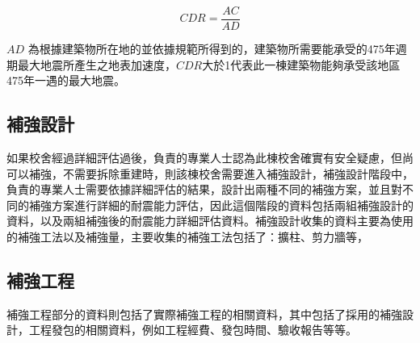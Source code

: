 \begin{equation} CDR = \dfrac{AC}{AD} \label{eq:CDR}\end{equation} 

$AD$ 為根據建築物所在地的並依據規範所得到的，建築物所需要能承受的475年週期最大地震所產生之地表加速度，$CDR$大於1代表此一棟建築物能夠承受該地區475年一遇的最大地震。

\subsection{補強設計}

如果校舍經過詳細評估過後，負責的專業人士認為此棟校舍確實有安全疑慮，但尚可以補強，不需要拆除重建時，則該棟校舍需要進入補強設計，補強設計階段中，負責的專業人士需要依據詳細評估的結果，設計出兩種不同的補強方案，並且對不同的補強方案進行詳細的耐震能力評估，因此這個階段的資料包括兩組補強設計的資料，以及兩組補強後的耐震能力詳細評估資料。補強設計收集的資料主要為使用的補強工法以及補強量，主要收集的補強工法包括了：擴柱、剪力牆等，

\subsection{補強工程}

補強工程部分的資料則包括了實際補強工程的相關資料，其中包括了採用的補強設計，工程發包的相關資料，例如工程經費、發包時間、驗收報告等等。